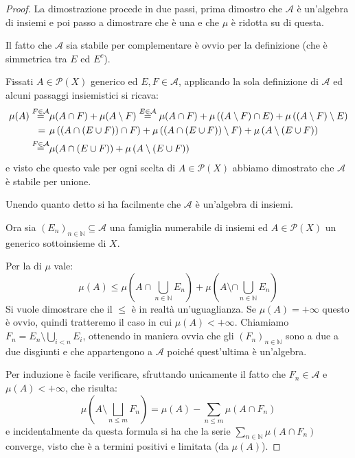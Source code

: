 \begin{proof}
	La dimostrazione procede in due passi, prima dimostro che $\mathcal A$ è un'algebra di insiemi e poi passo a dimostrare che è una \sigalg{} e che $\mu$ è \sigadd{} ridotta su di questa.
	
	Il fatto che $\mathcal A$ sia stabile per complementare è ovvio per la definizione (che è simmetrica tra $E$ ed $E^c$).
	
	Fissati $A\in\mathcal P(X)$ generico ed $E,F\in\mathcal A$, applicando la sola definizione di $\mathcal A$ ed alcuni passaggi insiemistici si ricava:
	\begin{align*}
		\mu(A)\stackrel{F\in\mathcal A}{=}&\mu(A\cap F)+\mu(A\setminus F)\stackrel{E\in\mathcal A}{=}
		\mu(A\cap F)+\mu\left((A\setminus F)\cap E\right)+\mu\left((A\setminus F)\setminus E\right)\\
		=\hspace{0.4em}&\mu\left((A\cap (E\cup F))\cap F\right)+\mu\left((A\cap (E\cup F))\setminus F\right)+
		\mu\left(A\setminus(E\cup F)\right)\\
		\stackrel{F\in\mathcal A}{=}&\mu(A\cap (E\cup F))+\mu\left(A\setminus(E\cup F)\right)
	\end{align*}
	e visto che questo vale per ogni scelta di $A\in\mathcal P(X)$ abbiamo dimostrato che $\mathcal A$ è stabile per unione.
	
	Unendo quanto detto si ha facilmente che $\mathcal A$ è un'algebra di insiemi.
	
	Ora sia $(E_n)_{n\in\mathbb N}\subseteq \mathcal A$ una famiglia numerabile di insiemi ed $A\in\mathcal P(X)$ un generico sottoinsieme di $X$.
	
	Per la \sigsubadd[ità] di $\mu$ vale:
	\begin{equation}\label{DisuguaglianzaFacileCaratheodory}
		\mu(A)\le \mu\left(A\cap\bigcup_{n\in\mathbb N} E_n\right)+\mu\left(A\setminus\cap\bigcup_{n\in\mathbb N} E_n\right)
	\end{equation}
	Si vuole dimostrare che il $\le$ è in realtà un'uguaglianza. Se $\mu(A)=+\infty$ questo è ovvio, quindi tratteremo il caso in cui $\mu(A)<+\infty$. Chiamiamo $F_n=E_n\setminus \bigcup_{i<n} E_i$, ottenendo in maniera ovvia che gli $(F_n)_{n\in\mathbb N}$ sono a due a due disgiunti e che appartengono a $\mathcal A$ poiché quest'ultima è un'algebra.
	
	Per induzione è facile verificare, sfruttando unicamente il fatto che $F_n\in\mathcal A$ e $\mu(A)<+\infty$, che risulta:
	\begin{equation}\label{IdentitaDifferenzaCaratheodory}
		\mu\left(A\setminus \bigsqcup_{n\le m} F_n\right)=\mu(A)-\sum_{n\le m} \mu(A\cap F_n)
	\end{equation}
	e incidentalmente da questa formula si ha che la serie $\sum_{n\in\mathbb N}\mu(A\cap F_n)$ converge, visto che è a termini positivi e limitata (da $\mu(A)$).
	

\end{proof}
